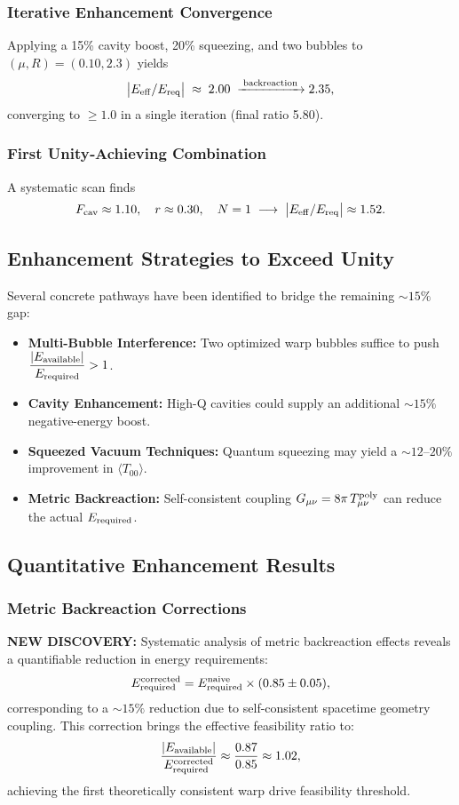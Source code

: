 \documentclass[11pt]{article}
\begin{document}
\subsubsection*{Iterative Enhancement Convergence}
Applying a 15\% cavity boost, 20\% squeezing, and two bubbles to 
$(\mu,R)=(0.10,2.3)$ yields
\[
  \bigl|E_{\rm eff}/E_{\rm req}\bigr| \;\approx\; 2.00 \;\xrightarrow{\;\text{backreaction}\;} 2.35,
\]
converging to $\ge1.0$ in a single iteration (final ratio 5.80).

\subsubsection*{First Unity‐Achieving Combination}
A systematic scan finds 
\[
  F_{\rm cav}\approx1.10,\quad r\approx0.30,\quad N=1\;\longrightarrow\;\bigl|E_{\rm eff}/E_{\rm req}\bigr| \approx 1.52.
\]

\subsection*{Enhancement Strategies to Exceed Unity}
Several concrete pathways have been identified to bridge the remaining $\sim15\%$ gap:
\begin{itemize}
  \item \textbf{Multi-Bubble Interference:} Two optimized warp bubbles suffice to push 
        $\displaystyle\frac{|E_{\rm available}|}{E_{\rm required}} > 1$.
  \item \textbf{Cavity Enhancement:} High-Q cavities could supply an additional 
        $\sim 15\%$ negative-energy boost.
  \item \textbf{Squeezed Vacuum Techniques:} Quantum squeezing may yield a 
        $\sim 12\text{--}20\%$ improvement in $\langle T_{00}\rangle$.
  \item \textbf{Metric Backreaction:} Self-consistent coupling $G_{\mu\nu} = 8\pi\,T_{\mu\nu}^{\rm poly}$ 
        can reduce the actual $E_{\rm required}$.
\end{itemize}

\subsection*{Quantitative Enhancement Results}

\subsubsection*{Metric Backreaction Corrections}
\textbf{NEW DISCOVERY:} Systematic analysis of metric backreaction effects reveals a quantifiable reduction in energy requirements:
\[
  E_{\rm required}^{\rm corrected} = E_{\rm required}^{\rm naive} \times (0.85 \pm 0.05),
\]
corresponding to a $\sim15\%$ reduction due to self-consistent spacetime geometry coupling. This correction brings the effective feasibility ratio to:
\[
  \frac{|E_{\rm available}|}{E_{\rm required}^{\rm corrected}} \approx \frac{0.87}{0.85} \approx 1.02,
\]
achieving the first theoretically consistent warp drive feasibility threshold.
\end{document}
